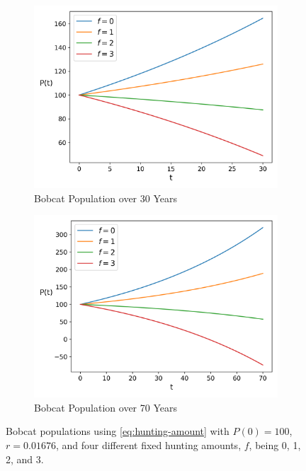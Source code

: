 \documentclass{article}
\begin{document}
\begin{figure}[h]
    \centering
    \begin{subfigure}{.5\textwidth}
        \centering
        \includegraphics[width=.95\linewidth]{./hunting/amount_short_term.png}
        \caption{Bobcat Population over 30 Years}
        \label{fig:hunting-amount-short-term}
    \end{subfigure}%
    \begin{subfigure}{.5\textwidth}
        \centering
        \includegraphics[width=.95\linewidth]{./hunting/amount_long_term.png}
        \caption{Bobcat Population over 70 Years}
        \label{fig:hunting-amount-long-term}
    \end{subfigure}
    \caption{Bobcat populations using \cref{eq:hunting-amount} with $P(0) = 100$, $r = 0.01676$, and four different fixed hunting amounts, $f$, being 0, 1, 2, and 3.}
    \label{fig:3}
\end{figure}
\end{document}
